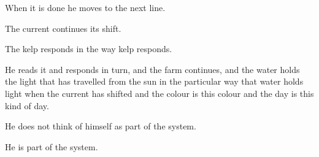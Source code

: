 When it is done he moves to the next line.

The current continues its shift.

The kelp responds in the way kelp responds.

He reads it and responds in turn, and the farm
continues, and the water holds the light that has
travelled from the sun in the particular way that
water holds light when the current has shifted
and the colour is this colour and the day is this
kind of day.

He does not think of himself as part of the system.

He is part of the system.


